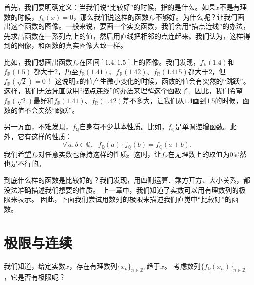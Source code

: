 \documentclass[12pt,UTF8]{ctexbook}
\begin{document}
首先，我们要明确定义：当我们说“比较好”的时候，指的是什么。如果$x$不是有理数的时候，$f_{\mathbb{R}}(x) = 0$，那么我们说这样的函数$f_{\mathbb{R}}$不够好。为什么呢？让我们画出这个函数的图像。一般来说，要画一个实变函数，我们会用“描点连线”的办法，先求出函数在一系列点上的值，然后用直线把相邻的点连起来。我们认为，这样得到的图像，和函数的真实图像大致一样。

比如，我们想画出函数$f_{\mathbb{R}}$在区间$[\,1.4;1.5\,]$上的图像。我们发现，$f_{\mathbb{R}}(1.4)$和$f_{\mathbb{R}}(1.5)$
都大于2，乃至$f_{\mathbb{R}}(1.41)$、$f_{\mathbb{R}}(1.42)$、$f_{\mathbb{R}}(1.415)$都大于$2$，但$f_{\mathbb{R}}(\sqrt{2}) = 0$！
这说明$x$的值产生微小变化的时候，函数的值会有突然的“跳跃”。这样，我们无法凭直觉用“描点连线”的办法来理解这个函数了。因此，我们希望
$f_{\mathbb{R}}(\sqrt{2})$最好和$f_{\mathbb{R}}(1.41)$、$f_{\mathbb{R}}(1.42)$差不多大，让我们从$1.4$画到$1.5$的时候，函数的值不会突然“跳跃”。

另一方面，不难发现，$f_{\mathbb{Q}}$自身有不少基本性质。比如，$f_{\mathbb{Q}}$是单调递增函数。此外，它有这样的性质：
$$\forall \, a, b\in \mathbb{Q}, \;\,\, f_{\mathbb{Q}}(a) \cdot f_{\mathbb{Q}}(b) = f_{\mathbb{Q}}(a + b).$$
我们希望$f_{\mathbb{R}}$对任意实数也保持这样的性质。这时，让$f_{\mathbb{R}}$在无理数上的取值为$0$显然也是不行的。

到底什么样的函数是比较好的？我们发现，用四则运算、乘方开方、大小关系，都没法准确描述我们想要的性质。
上一章中，我们知道了实数可以用有理数列的极限来表示。
因此，下面我们尝试用数列的极限来描述我们直觉中“比较好”的函数。

\section{极限与连续}
我们知道，给定实数$x$，存在有理数列$\{x_n\}_{n\in\mathbb{Z}^+}$趋于$x$。
考虑数列$\{f_{\mathbb{Q}}(x_n)\}_{n\in\mathbb{Z}^+}$，它是否有极限呢？
\end{document}
